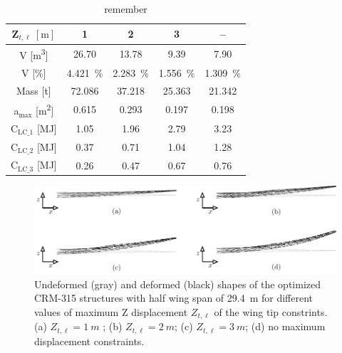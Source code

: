 \begin{table}
    \small
    \centering
    \begin{tabular}{ccccc}
    \toprule
    $\bm{Z}_{t,\ell}\:[\text{m}]$ & 1&2&3&--\\ \midrule
    V [\unit{\meter^3}]&  26.70&13.78&9.39&7.90\\
    V [\unit{\%}]&   \qty{4.421}{\%}   & \qty{2.283}{\%}&\qty{1.556}{\%}&\qty{1.309}{\%}  \\
    Mass [\unit{\tonne}]  &72.086&37.218&25.363&21.342\\
    a$_{\text{max}}$ [\unit{\meter^2}]&  0.615    & 0.293&0.197&0.198\\
    C$_\text{LC\_1}$ [\unit{\mega \joule}]   &  1.05    &  1.96&2.79& 3.23\\
    C$_\text{LC\_2}$ [\unit{\mega \joule}]   &   0.37   &  0.71&1.04& 1.28\\
    C$_\text{LC\_3}$ [\unit{\mega \joule}]   &   0.26   &  0.47&0.67& 0.76\\

    \bottomrule
    \end{tabular}
    \caption{remember }
    \label{tab:07_disp}
\end{table}

\begin{figure}
    \centering
    \includegraphics[width=\linewidth]{figures/07_aeronautic/00_dispalcements/disp.pdf}
     \caption{Undeformed (gray) and deformed (black) shapes of the optimized CRM-315 structures with half wing span of \qty{29.4}{m} for different values of maximum Z displacement $Z_{t,\ell}$ of the wing tip constrints. (a) $Z_{t,\ell}=\qty{1}{m}$  ; (b) $Z_{t,\ell}=\qty{2}{m}$; (c) $Z_{t,\ell}=\qty{3}{m}$; (d) no maximum displacement constraints.}
    \label{fig:07_disp_sol}
\end{figure}

